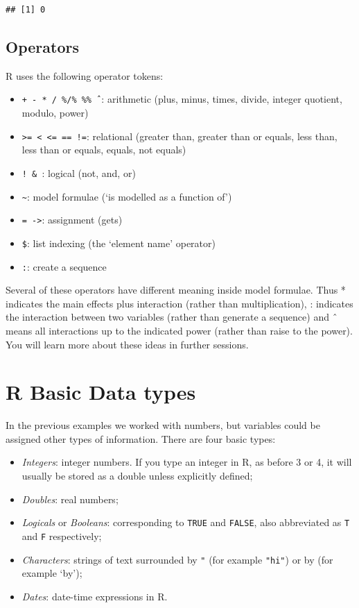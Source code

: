 \documentclass[
]{book}
\providecommand{\tightlist}{%
  \setlength{\itemsep}{0pt}\setlength{\parskip}{0pt}}
\begin{document}
\begin{verbatim}
## [1] 0
\end{verbatim}

\hypertarget{operators}{%
\subsection{Operators}\label{operators}}

R uses the following operator tokens:

\begin{itemize}
\tightlist
\item
  \texttt{+\ -\ *\ /\ \%/\%\ \%\%\ ˆ}: arithmetic (plus, minus, times, divide, integer quotient, modulo, power)
\item
  \texttt{\textgreater{}=\ \textless{}\ \textless{}=\ ==\ !=}: relational (greater than, greater than or equals, less than, less than or equals, equals, not equals)
\item
  \texttt{!\ \&\ \textbar{}}: logical (not, and, or)
\item
  \texttt{\textasciitilde{}}: model formulae (`is modelled as a function of')
\item
  \texttt{=\ -\textgreater{}}: assignment (gets)
\item
  \texttt{\$}: list indexing (the `element name' operator)
\item
  \texttt{:}: create a sequence
\end{itemize}

Several of these operators have different meaning inside model formulae. Thus * indicates the main effects plus interaction (rather than multiplication), : indicates the interaction between two variables (rather than generate a sequence) and ˆ means all interactions up to the indicated power (rather than raise to the power). You will learn more about these ideas in further sessions.

\hypertarget{r-basic-data-types}{%
\section{R Basic Data types}\label{r-basic-data-types}}

In the previous examples we worked with numbers, but variables could be assigned other types of information. There are four basic types:

\begin{itemize}
\item
  \emph{Integers}: integer numbers. If you type an integer in R, as before 3 or 4, it will usually be stored as a double unless explicitly defined;
\item
  \emph{Doubles}: real numbers;
\item
  \emph{Logicals} or \emph{Booleans}: corresponding to \texttt{TRUE} and \texttt{FALSE}, also abbreviated as \texttt{T} and \texttt{F} respectively;
\item
  \emph{Characters}: strings of text surrounded by \texttt{"} (for example \texttt{"hi"}) or by \texttt{\textquotesingle{}} (for example `by');
\item
  \emph{Dates}: date-time expressions in R.
\end{itemize}
\end{document}
